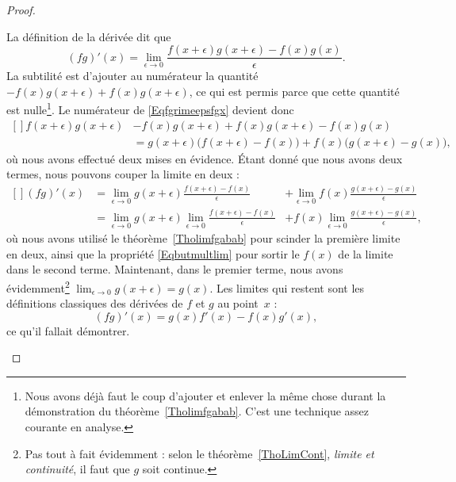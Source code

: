 \begin{proof}
\begin{subproof}
		La définition de la dérivée dit que
		\begin{equation}        \label{Eqfgrimeepsfgx}
			(fg)'(x)=\lim_{\epsilon\to 0}\frac{f(x+\epsilon)g(x+\epsilon)-f(x)g(x)}{\epsilon}.
		\end{equation}
		La subtilité est d'ajouter au numérateur la quantité \( -f(x)g(x+\epsilon)+f(x)g(x+\epsilon)\), ce qui est permis parce que cette quantité est nulle\footnote{Nous avons déjà faut le coup d'ajouter et enlever la même chose durant la démonstration du théorème~\ref{Tholimfgabab}. C'est une technique assez courante en analyse.}. Le numérateur de \eqref{Eqfgrimeepsfgx} devient donc
		\begin{equation}
			\begin{aligned}[]
				f(x+\epsilon)g(x+\epsilon) & -f(x)g(x+\epsilon)+f(x)g(x+\epsilon)-f(x)g(x)                                     \\
				                           & = g(x+\epsilon)\big( f(x+\epsilon)-f(x) \big)+f(x)\big( g(x+\epsilon)-g(x) \big),
			\end{aligned}
		\end{equation}
		où nous avons effectué deux mises en évidence. Étant donné que nous avons deux termes, nous pouvons couper la limite en deux :
		\begin{equation}
			\begin{aligned}[]
				(fg)'(x) & =\lim_{\epsilon\to 0}g(x+\epsilon)\frac{ f(x+\epsilon)-f(x) }{\epsilon}                     & +\lim_{\epsilon\to 0}f(x)\frac{ g(x+\epsilon)-g(x) }{\epsilon}  \\
				         & =\lim_{\epsilon\to 0}g(x+\epsilon)\lim_{\epsilon\to 0}\frac{ f(x+\epsilon)-f(x) }{\epsilon} & +f(x)\lim_{\epsilon\to 0}\frac{ g(x+\epsilon)-g(x) }{\epsilon},
			\end{aligned}
		\end{equation}
		où nous avons utilisé le théorème~\ref{Tholimfgabab} pour scinder la première limite en deux, ainsi que la propriété \eqref{Eqbutmultlim} pour sortir le \( f(x)\) de la limite dans le second terme. Maintenant, dans le premier terme, nous avons évidemment\footnote{Pas tout à fait évidemment : selon le théorème~\ref{ThoLimCont}, \emph{limite et continuité}, il faut que \( g\) soit continue.} \( \lim_{\epsilon\to 0}g(x+\epsilon)=g(x)\). Les limites qui restent sont les définitions classiques des dérivées de \( f\) et \( g\) au point~\( x\) :
		\begin{equation}
			(fg)'(x)=g(x)f'(x)-f(x)g'(x),
		\end{equation}
		ce qu'il fallait démontrer.


\end{subproof}
\end{proof}
